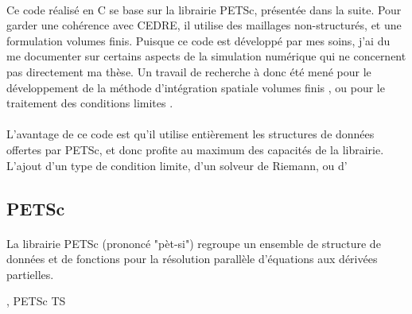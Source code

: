     \paragraph{}
    Ce code réalisé en C se base sur la librairie PETSc, présentée dans la suite.
    Pour garder une cohérence avec CEDRE, il utilise des maillages non-structurés, et une formulation volumes finis.
    Puisque ce code est développé par mes soins, j'ai du me documenter sur certains aspects de la simulation numérique qui ne concernent pas directement ma thèse.
    Un travail de recherche à donc été mené pour le développement de la méthode d'intégration spatiale volumes finis \cite{EymardGallouetHerbin2000}, ou pour le traitement des conditions limites \cite{PoinsotLele1992}.



    \paragraph{}
    L'avantage de ce code est qu'il utilise entièrement les structures de données offertes par PETSc, et donc profite au maximum des capacités de la librairie.
    L'ajout d'un type de condition limite, d'un solveur de Riemann, ou d'

  \subsection{PETSc}

  \paragraph{}
  La librairie PETSc (prononcé "pèt-si") regroupe un ensemble de structure de données et de fonctions pour la résolution parallèle d'équations aux dérivées partielles.
  \cite{petsc-web-page, petsc-user-ref, petsc-efficient}



, PETSc TS \cite{AbhyankarBrownConstantinescuEtAl2018}
%
